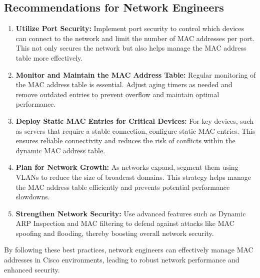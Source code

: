 \documentclass[11pt,a4paper]{article}
\begin{document}
    \subsection*{Recommendations for Network Engineers}
    \begin{enumerate}
        \item \textbf{Utilize Port Security:} Implement port security to control which devices can connect to the network and limit the number of MAC addresses per port. This not only secures the network but also helps manage the MAC address table more effectively.
        \item \textbf{Monitor and Maintain the MAC Address Table:} Regular monitoring of the MAC address table is essential. Adjust aging timers as needed and remove outdated entries to prevent overflow and maintain optimal performance.
        \item \textbf{Deploy Static MAC Entries for Critical Devices:} For key devices, such as servers that require a stable connection, configure static MAC entries. This ensures reliable connectivity and reduces the risk of conflicts within the dynamic MAC address table.
        \item \textbf{Plan for Network Growth:} As networks expand, segment them using VLANs to reduce the size of broadcast domains. This strategy helps manage the MAC address table efficiently and prevents potential performance slowdowns.
        \item \textbf{Strengthen Network Security:} Use advanced features such as Dynamic ARP Inspection and MAC filtering to defend against attacks like MAC spoofing and flooding, thereby boosting overall network security.
    \end{enumerate}

By following these best practices, network engineers can effectively manage MAC addresses in Cisco environments, leading to robust network performance and enhanced security.

\newpage

\begin{multicols}{2}
\small


\end{multicols}
\end{document}

